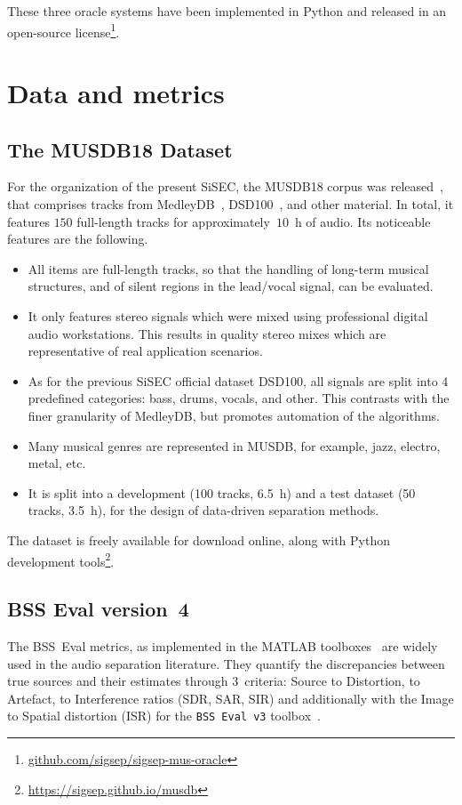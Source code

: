 \documentclass{llncs}
\begin{document}
These three oracle systems have been implemented in Python and released in an open-source license\footnote{\url{github.com/sigsep/sigsep-mus-oracle}}.

\section{Data and metrics}

\subsection{The MUSDB18 Dataset}
For the organization of the present SiSEC, the MUSDB18 corpus was released~\cite{musdb18}, that comprises tracks from MedleyDB~\cite{medleydb}, DSD100~\cite{sisec2015,sisec2016}, and other material. In total, it features $150$ full-length tracks for approximately~$10$~h of audio. Its noticeable features are the following.
\begin{itemize}
\item All items are full-length tracks, so that the handling of long-term musical structures, and of silent regions in the lead/vocal signal, can be evaluated.
\item It only features stereo signals which were mixed using professional digital audio workstations. This results in quality stereo mixes which are representative of real application scenarios.
\item As for the previous SiSEC official dataset DSD100, all signals are split into 4 predefined categories: bass, drums, vocals, and other. This contrasts with the finer granularity of MedleyDB, but promotes automation of the algorithms.
\item Many musical genres are represented in MUSDB, for example, jazz, electro, metal, etc.
\item It is split into a development (100 tracks, 6.5~h) and a test dataset (50 tracks, 3.5~h), for the design of data-driven separation methods.
\end{itemize}
The dataset is freely available for download online, along with Python development tools\footnote{\url{https://sigsep.github.io/musdb}}.

\subsection{BSS Eval version~4}
\label{ssec:bsseval-results}

The BSS~Eval metrics, as implemented in the MATLAB toolboxes~\cite{bssevalv2,bssevalv3} are widely used in the audio separation literature. They quantify the discrepancies between true sources and their estimates through $3$~criteria: Source to Distortion, to Artefact, to Interference ratios (SDR, SAR, SIR) and additionally with the Image to Spatial distortion (ISR) for the \texttt{BSS~Eval v3} toolbox~\cite{bssevalv3}.
\end{document}
